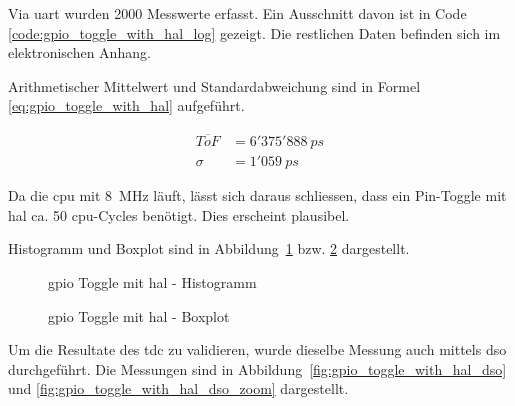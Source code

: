 \documentclass[11pt,a4paper,hidelinks]{article}
\begin{document}
Via \acrshort{uart} wurden 2000 Messwerte erfasst. Ein Ausschnitt davon ist in Code \ref{code:gpio_toggle_with_hal_log}
gezeigt. Die restlichen Daten befinden sich im elektronischen Anhang.



Arithmetischer Mittelwert und Standardabweichung sind in Formel \ref{eq:gpio_toggle_with_hal} aufgeführt.

\begin{equation}\label{eq:gpio_toggle_with_hal}
    \begin{split}
        \overline{ToF} &= 6'375'888~ps\\
        \sigma         &= 1'059~ps
    \end{split}
\end{equation}

Da die \acrshort{cpu} mit 8~MHz läuft, lässt sich daraus schliessen, dass ein Pin-Toggle mit \acrshort{hal} ca. 50
\acrshort{cpu}-Cycles benötigt. Dies erscheint plausibel.

Histogramm und Boxplot sind in Abbildung~\ref{fig:gpio_toggle_with_hal_histogram} bzw.
\ref{fig:gpio_toggle_with_hal_boxplot} dargestellt.

\begin{figure}[H]
    \centering
    
    \caption{\acrshort{gpio} Toggle mit \acrshort{hal} - Histogramm}\label{fig:gpio_toggle_with_hal_histogram}
\end{figure}

\begin{figure}[H]
    \centering
    
    \caption{\acrshort{gpio} Toggle mit \acrshort{hal} - Boxplot}\label{fig:gpio_toggle_with_hal_boxplot}
\end{figure}

Um die Resultate des \acrshort{tdc} zu validieren, wurde dieselbe Messung auch mittels \acrfull{dso} durchgeführt. Die
Messungen sind in Abbildung~\ref{fig:gpio_toggle_with_hal_dso} und \ref{fig:gpio_toggle_with_hal_dso_zoom} dargestellt.
\end{document}

